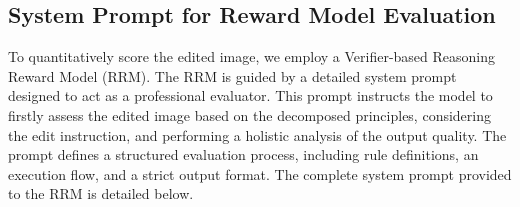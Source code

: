 \subsection{System Prompt for Reward Model Evaluation}
\label{sec:appendix_prompt_rrm}
To quantitatively score the edited image, we employ a Verifier-based Reasoning Reward Model (RRM). The RRM is guided by a detailed system prompt designed to act as a professional evaluator. This prompt instructs the model to firstly assess the edited image based on the decomposed principles, considering the edit instruction, and performing a holistic analysis of the output quality. The prompt defines a structured evaluation process, including rule definitions, an execution flow, and a strict output format. The complete system prompt provided to the RRM is detailed below.
